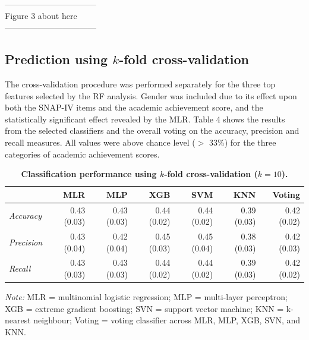 \documentclass[10pt,letterpaper]{article}
\begin{document}
{\begin{center}
---------------------------------\\
 
Figure 3 about here \\
 
---------------------------------\\
\end{center}
  
  

\subsection*{Prediction using $k$-fold cross-validation}

The cross-validation procedure was performed separately for the three top features selected by the RF analysis. Gender was included due to its effect upon both the SNAP-IV items and the academic achievement score, and the statistically significant effect revealed by the MLR.  
Table 4 shows the results from the selected classifiers and the overall voting on the accuracy, precision and recall measures. All values were above chance level ($>$ 33\%) for the three categories of academic achievement scores. 

  
\begin{table}[!ht]
\begin{adjustwidth}{-7mm}{0in} 
\centering
\caption{\bf Classification performance using $k$-fold cross-validation ($k=10$).} 
\vspace{5mm}
\begin{tabular}{|lrrrrrr|}
\hline
 & MLR & MLP & XGB & SVM & KNN & Voting\\\hline
 \emph{Accuracy} &0.43 (0.03) & 0.43 (0.03) &0.44 (0.02) &0.44 (0.02) & 0.39 (0.03) & 0.42 (0.02)\\
 \emph{Precision} & 0.43 (0.04) & 0.42 (0.04) & 0.45 (0.03) & 0.45 (0.04) & 0.38 (0.03) & 0.42 (0.03)\\
 \emph{Recall} & 0.43 (0.03) & 0.43 (0.03) & 0.44 (0.02) & 0.44 (0.02) & 0.39 (0.03) & 0.42 (0.02) \\
 \hline
\end{tabular} 
\label{crossvalidation}
\end{adjustwidth}
\vspace{2mm}

\textit{Note:} MLR = multinomial logistic regression; MLP = multi-layer perceptron; XGB = extreme gradient boosting; SVN = support vector machine; 
KNN = k-nearest neighbour; Voting = voting classifier across MLR, MLP, XGB, SVN, and KNN. \\ 


\end{table}}
\end{document}

